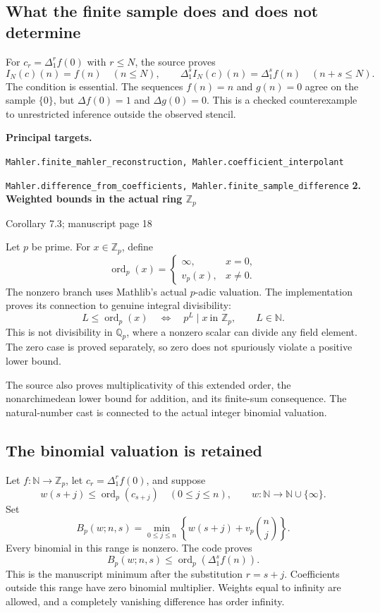 \documentclass[11pt]{article}
\newcommand{\Q}{\mathbb Q}\newcommand{\Z}{\mathbb Z}\newcommand{\N}{\mathbb N}
\newcommand{\target}[1]{{\footnotesize\texttt{#1}}}
\newcommand{\pageheading}[2]{{\Large\bfseries\color{ink}#1}\par{\small #2}\par\medskip}
\newcommand{\ord}{\operatorname{ord}}
\begin{document}
\subsection*{What the finite sample does and does not determine}
For $c_r=\Delta_1^r f(0)$ with $r\leq N$, the source proves
\[
 I_N(c)(n)=f(n)\quad(n\leq N),\qquad
 \Delta_1^s I_N(c)(n)=\Delta_1^s f(n)\quad(n+s\leq N).
\]
The condition is essential. The sequences $f(n)=n$ and $g(n)=0$ agree on the sample $\{0\}$, but $\Delta f(0)=1$ and $\Delta g(0)=0$. This is a checked counterexample to unrestricted inference outside the observed stencil.

\textbf{Principal targets.}\par
\target{Mahler.finite\_mahler\_reconstruction, Mahler.coefficient\_interpolant}\par
\target{Mahler.difference\_from\_coefficients, Mahler.finite\_sample\_difference}
\newpage
\pageheading{2. Weighted bounds in the actual ring $\Z_p$}{Corollary 7.3; manuscript page 18}
Let $p$ be prime. For $x\in\Z_p$, define
\[
 \ord_p(x)=\begin{cases}\infty,&x=0,\\v_p(x),&x\neq0.\end{cases}
\]
The nonzero branch uses Mathlib's actual $p$-adic valuation. The implementation proves its connection to genuine integral divisibility:
\[
 \boxed{L\leq\ord_p(x)\quad\Longleftrightarrow\quad p^L\mid x
 \ \text{in }\Z_p,\qquad L\in\N.}
\]
This is not divisibility in $\Q_p$, where a nonzero scalar can divide any field element. The zero case is proved separately, so zero does not spuriously violate a positive lower bound.

The source also proves multiplicativity of this extended order, the nonarchimedean lower bound for addition, and its finite-sum consequence. The natural-number cast is connected to the actual integer binomial valuation.

\subsection*{The binomial valuation is retained}
Let $f:\N\to\Z_p$, let $c_r=\Delta_1^r f(0)$, and suppose
\[
 w(s+j)\leq\ord_p(c_{s+j})\quad(0\leq j\leq n),
 \qquad w:\N\to\N\cup\{\infty\}.
\]
Set
\[
 B_p(w;n,s)=\min_{0\leq j\leq n}
 \left\{w(s+j)+v_p\!\binom nj\right\}.
\]
Every binomial in this range is nonzero. The code proves
\[
 \boxed{B_p(w;n,s)\leq\ord_p(\Delta_1^s f(n)).}
\]
This is the manuscript minimum after the substitution $r=s+j$. Coefficients outside this range have zero binomial multiplier. Weights equal to infinity are allowed, and a completely vanishing difference has order infinity.
\end{document}
